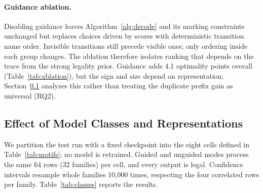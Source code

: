 \documentclass[manuscript,screen,nonacm]{acmart}
\begin{document}
\paragraph{Guidance ablation.}
\label{sec:ablation}
Disabling guidance leaves Algorithm~\ref{alg:decode} and its marking constraints unchanged but replaces choices driven by scores with deterministic transition name order. Invisible transitions still precede visible ones; only ordering inside each group changes. The ablation therefore isolates ranking that depends on the trace from the strong legality prior. Guidance adds 4.1 optimality points overall (Table~\ref{tab:ablation}), but the sign and size depend on representation; Section~\ref{sec:classes} analyzes this rather than treating the duplicate prefix gain as universal (RQ2).

\subsection{Effect of Model Classes and Representations}
\label{sec:classes}

We partition the test run with a fixed checkpoint into the eight cells defined in Table~\ref{tab:motifs}; no model is retrained. Guided and unguided modes process the same 64 rows (32 families) per cell, and every output is legal. Confidence intervals resample whole families 10{,}000 times, respecting the four correlated rows per family. Table~\ref{tab:classes} reports the results.
\end{document}

